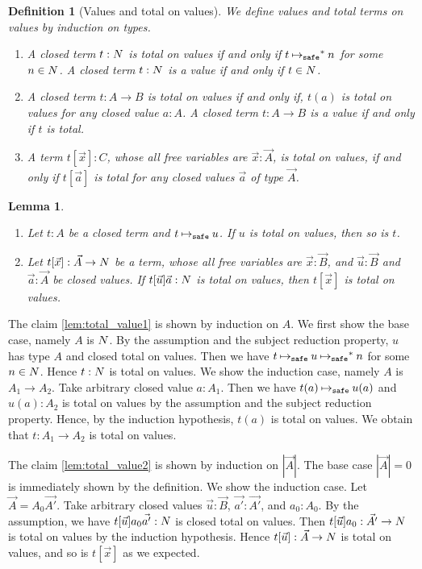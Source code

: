 \documentclass{article}
\newtheorem{lemma}[theorem]{Lemma}
\newtheorem{definition}[theorem]{Definition}
\newenvironment{proof}[1][Proof]{\begin{trivlist}
\item[\hskip \labelsep {\bfseries #1}]}{\end{trivlist}}
\begin{document}
\begin{definition}[Values and total on values]
  We define values and total terms on values by induction on types. 
  \begin{enumerate}
  \item
    A closed term $t:{N}$ is total on values
    if and only if $t \mathbin{{\mapsto}_{\tiny \tt safe}}^* n$ for some $n\in {N}$.
    A closed term $t:{N}$ is a value if and only if $t \in {N}$.
  \item
    A closed term $t:A\rightarrow B$ is total on values
    if and only if, $t(a)$ is total on values for any closed value $a:A$.
    A closed term $t:A\rightarrow B$ is a value if and only if $t$ is total.
  \item
    A term $t[\vec{x}]:C$, whose all free variables are $\vec{x}:\vec{A}$, is
    total on values, if and only if
    $t[\vec{a}]$ is total for any closed values $\vec{a}$ of type $\vec{A}$.
  \end{enumerate}
\end{definition}

\begin{lemma}\label{lem:total_value}
  \begin{enumerate}
  \item\label{lem:total_value1}
    Let $t:A$ be a closed term and $t \mathbin{{\mapsto}_{\tiny \tt safe}} u$.
    If $u$ is total on values, then so is $t$.
  \item\label{lem:total_value2}
    Let $t[\vec{x}]:\vec{A}\rightarrow{N}$ be a term,
    whose all free variables are $\vec{x}:\vec{B}$,
    and $\vec{u}:\vec{B}$ and $\vec{a}:\vec{A}$ be closed values.
    If $t[\vec{u}]\vec{a}:{N}$ is total on values, then $t[\vec{x}]$ is total on values. 
  \end{enumerate}
\end{lemma}
\begin{proof}
  The claim \ref{lem:total_value1} is shown by induction on $A$. 
  We first show the base case, namely $A$ is ${N}$.
  By the assumption and the subject reduction property, $u$ has type $A$ and closed total on values.
  Then we have $t \mathbin{{\mapsto}_{\tiny \tt safe}} u \mathbin{{\mapsto}_{\tiny \tt safe}}^* n$ for some $n\in{N}$. 
  Hence $t:{N}$ is total on values.
  We show the induction case, namely $A$ is $A_1\rightarrow A_2$.
  Take arbitrary closed value $a:A_1$. Then we have $t(a) \mathbin{{\mapsto}_{\tiny \tt safe}} u(a)$ and 
  $u(a):A_2$ is total on values by the assumption and the subject reduction property.
  Hence, by the induction hypothesis, $t(a)$ is total on values. 
  We obtain that $t:A_1\rightarrow A_2$ is total on values. 
  
  The claim \ref{lem:total_value2} is shown by induction on $|\vec{A}|$.
  The base case $|\vec{A}| = 0$ is immediately shown by the definition.
  We show the induction case. Let $\vec{A} = A_0\vec{A'}$.
  Take arbitrary closed values $\vec{u}:\vec{B}$, $\vec{a'}:\vec{A'}$, and $a_0:A_0$. 
  By the assumption, we have $t[\vec{u}]a_0\vec{a'}:{N}$ is closed total on values. 
  Then $t[\vec{u}]a_0:\vec{A'}\rightarrow{N}$ is total on values by the induction hypothesis.
  Hence $t[\vec{u}]:\vec{A}\rightarrow{N}$ is total on values,
  and so is $t[\vec{x}]$ as we expected.
\end{proof}
\end{document}
